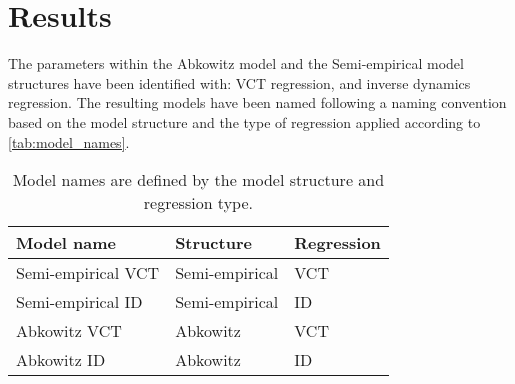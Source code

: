 \section{Results}
\label{sec:results}
The parameters within the Abkowitz model and the Semi-empirical model structures have been identified with: VCT regression, and inverse dynamics regression. The resulting models have been named following a  naming convention based on the model structure and the type of regression applied according to \autoref{tab:model_names}.
\begin{table}[h!]
    \caption{Model names are defined by the model structure and regression type.}
    \label{tab:model_names}
    \centering
    \begin{tabular}{l l l}
        Model name & Structure & Regression \\
        \hline
        Semi-empirical VCT & Semi-empirical & VCT \\
        Semi-empirical ID & Semi-empirical & ID \\
        Abkowitz VCT & Abkowitz & VCT \\
        Abkowitz ID & Abkowitz & ID \\
    \end{tabular}
\end{table}


